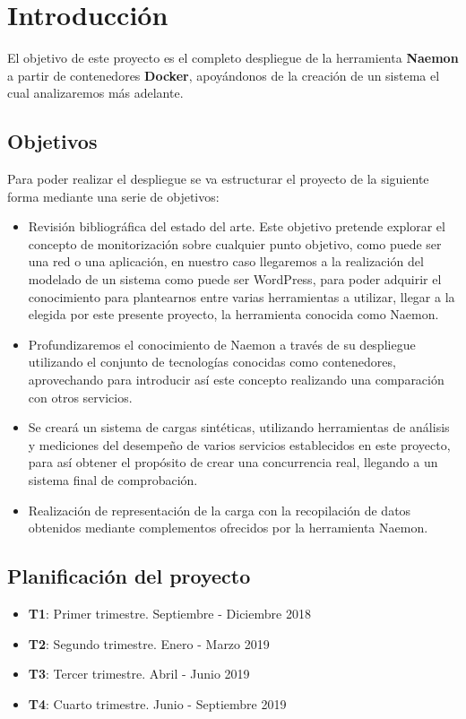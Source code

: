 \chapter{Introducción} 

El objetivo de este proyecto es el completo despliegue de la herramienta \textbf{Naemon} a partir de contenedores \textbf{Docker}, apoyándonos de la creación de un sistema el cual analizaremos más adelante.

\section{Objetivos}

Para poder realizar el despliegue se va estructurar el proyecto de la siguiente forma mediante una serie de objetivos:
\begin{itemize}
	\item Revisión bibliográfica del estado del arte. Este objetivo pretende explorar el concepto de monitorización sobre cualquier punto objetivo, como puede ser una red o una aplicación, en nuestro caso llegaremos a la realización del modelado de un sistema como puede ser WordPress, para poder adquirir el conocimiento para plantearnos entre varias herramientas a utilizar, llegar a la elegida por este presente proyecto, la herramienta conocida como Naemon.
	\item Profundizaremos el conocimiento de Naemon a través de su despliegue utilizando el conjunto de tecnologías conocidas como contenedores, aprovechando para introducir así este concepto realizando una comparación con otros servicios.
	\item Se creará un sistema de cargas sintéticas, utilizando herramientas de análisis y mediciones del desempeño de varios servicios establecidos en este proyecto, para así obtener el propósito de crear una concurrencia real, llegando a un sistema final de comprobación.
	\item Realización de representación de la carga con la recopilación de datos obtenidos mediante complementos ofrecidos por la herramienta Naemon.	
\end{itemize}

\section{Planificación del proyecto}
\begin{itemize}
	\item \textbf{T1}: Primer trimestre. Septiembre - Diciembre 2018
	\item \textbf{T2}: Segundo trimestre. Enero - Marzo 2019
	\item \textbf{T3}: Tercer trimestre. Abril - Junio 2019
	\item \textbf{T4}: Cuarto trimestre. Junio - Septiembre 2019
\end{itemize}


